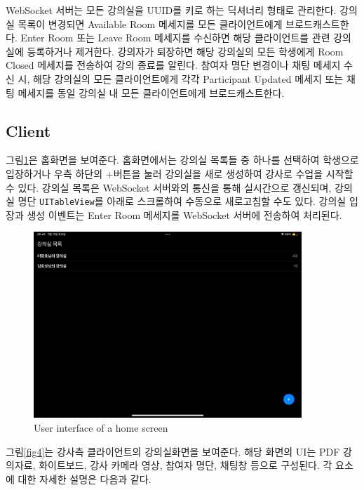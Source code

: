 \documentclass[pdflatex,sn-mathphys-num]{sn-jnl}%
\theoremstyle{thmstyleone}%
\theoremstyle{thmstyletwo}%
\theoremstyle{thmstylethree}%
\begin{document}
WebSocket 서버는 모든 강의실을 UUID를 키로 하는 딕셔너리 형태로 관리한다. 강의실 목록이 변경되면 Available Room 메세지를 모든 클라이언트에게 브로드캐스트한다. Enter Room 또는 Leave Room 메세지를 수신하면 해당 클라이언트를 관련 강의실에 등록하거나 제거한다. 강의자가 퇴장하면 해당 강의실의 모든 학생에게 Room Closed 메세지를 전송하여 강의 종료를 알린다. 참여자 명단 변경이나 채팅 메세지 수신 시, 해당 강의실의 모든 클라이언트에게 각각 Participant Updated 메세지 또는 채팅 메세지를 동일 강의실 내 모든 클라이언트에게 브로드캐스트한다.

\subsection{Client}\label{subsec4}

그림\ref{fig3}은 홈화면을 보여준다. 홈화면에서는 강의실 목록들 중 하나를 선택하여 학생으로 입장하거나 우측 하단의 +버튼을 눌러 강의실을 새로 생성하여 강사로 수업을 시작할 수 있다. 강의실 목록은 WebSocket 서버와의 통신을 통해 실시간으로 갱신되며, 강의실 명단 \verb+UITableView+를 아래로 스크롤하여 수동으로 새로고침할 수도 있다. 강의실 입장과 생성 이벤트는 Enter Room 메세지를 WebSocket 서버에 전송하여 처리된다.

\begin{figure}[H]
\centering
\includegraphics[width=0.9\textwidth]{home.PNG}
\caption{User interface of a home screen}\label{fig3}
\end{figure}

\noindent
그림\ref{fig4}는 강사측 클라이언트의 강의실화면을 보여준다. 해당 화면의 UI는 PDF 강의자료, 화이트보드, 강사 카메라 영상, 참여자 명단, 채팅창 등으로 구성된다. 각 요소에 대한 자세한 설명은 다음과 같다.
\end{document}
